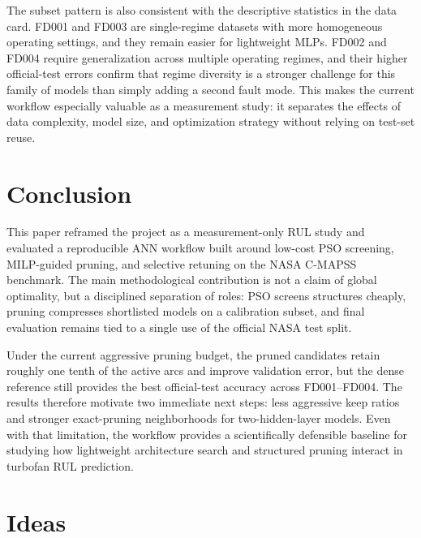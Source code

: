 \documentclass[12pt, a4paper]{article}
\begin{document}
The subset pattern is also consistent with the descriptive statistics in the data card. FD001 and FD003 are single-regime datasets with more homogeneous operating settings, and they remain easier for lightweight MLPs. FD002 and FD004 require generalization across multiple operating regimes, and their higher official-test errors confirm that regime diversity is a stronger challenge for this family of models than simply adding a second fault mode. This makes the current workflow especially valuable as a measurement study: it separates the effects of data complexity, model size, and optimization strategy without relying on test-set reuse.

\section{Conclusion}

This paper reframed the project as a measurement-only RUL study and evaluated a reproducible ANN workflow built around low-cost PSO screening, MILP-guided pruning, and selective retuning on the NASA C-MAPSS benchmark. The main methodological contribution is not a claim of global optimality, but a disciplined separation of roles: PSO screens structures cheaply, pruning compresses shortlisted models on a calibration subset, and final evaluation remains tied to a single use of the official NASA test split.

Under the current aggressive pruning budget, the pruned candidates retain roughly one tenth of the active arcs and improve validation error, but the dense reference still provides the best official-test accuracy across FD001--FD004. The results therefore motivate two immediate next steps: less aggressive keep ratios and stronger exact-pruning neighborhoods for two-hidden-layer models. Even with that limitation, the workflow provides a scientifically defensible baseline for studying how lightweight architecture search and structured pruning interact in turbofan RUL prediction.




\appendix
\section{Ideas}
\end{document}
